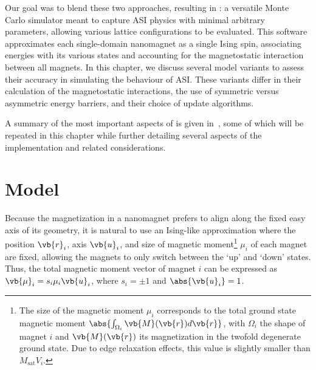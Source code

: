 Our goal was to blend these two approaches, resulting in \hotspice: a versatile Monte Carlo simulator meant to capture ASI physics with minimal arbitrary parameters, allowing various lattice configurations to be evaluated.
This software approximates each single-domain nanomagnet as a single Ising spin, associating energies with its various states and accounting for the magnetostatic interaction between all magnets.
In this chapter, we discuss several model variants to assess their accuracy in simulating the behaviour of ASI.
These variants differ in their calculation of the magnetostatic interactions, the use of symmetric versus asymmetric energy barriers, and their choice of update algorithms. \\\par

A summary of the most important aspects of \hotspice is given in~\cite{MAES-24}, some of which will be repeated in this chapter while further detailing several aspects of the implementation and related considerations.

\section{Model}
Because the magnetization in a nanomagnet prefers to align along the fixed easy axis of its geometry, it is natural to use an Ising-like approximation where the position $\vb{r}_i$, axis $\vb{u}_i$, and size of magnetic moment\footnote{
	The size of the magnetic moment $\mu_i$ corresponds to the total ground state magnetic moment $\abs{\int_{\Omega_i} \vb{M}(\vb{r})d\vb{r}}$, with $\Omega_i$ the shape of magnet $i$ and $\vb{M}(\vb{r})$ its magnetization in the twofold degenerate ground state. Due to edge relaxation effects, this value is slightly smaller than $M_\mathrm{sat} V_i$.
} $\mu_i$ of each magnet are fixed, allowing the magnets to only switch between the `up' and `down' states.
Thus, the total magnetic moment vector of magnet $i$ can be expressed as $\vb{\mu}_i = s_i \mu_i \vb{u}_i$, where $s_i = \pm 1$ and $\abs{\vb{u}_i} = 1$. \par

